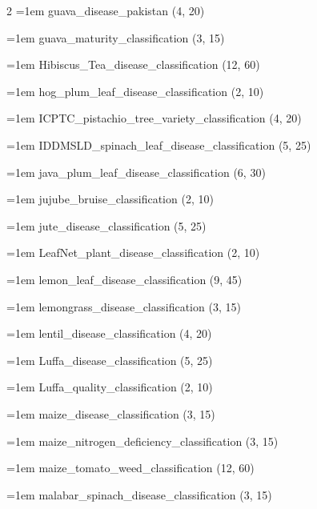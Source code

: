 \begin{multicols}{2}
\hangindent=1em guava\_\allowbreak{}disease\_\allowbreak{}pakistan (4, 20)\par
\hangindent=1em guava\_\allowbreak{}maturity\_\allowbreak{}classification (3, 15)\par
\hangindent=1em Hibiscus\_\allowbreak{}Tea\_\allowbreak{}disease\_\allowbreak{}classification (12, 60)\par
\hangindent=1em hog\_\allowbreak{}plum\_\allowbreak{}leaf\_\allowbreak{}disease\_\allowbreak{}classification (2, 10)\par
\hangindent=1em ICPTC\_\allowbreak{}pistachio\_\allowbreak{}tree\_\allowbreak{}variety\_\allowbreak{}classification (4, 20)\par
\hangindent=1em IDDMSLD\_\allowbreak{}spinach\_\allowbreak{}leaf\_\allowbreak{}disease\_\allowbreak{}classification (5, 25)\par
\hangindent=1em java\_\allowbreak{}plum\_\allowbreak{}leaf\_\allowbreak{}disease\_\allowbreak{}classification (6, 30)\par
\hangindent=1em jujube\_\allowbreak{}bruise\_\allowbreak{}classification (2, 10)\par
\hangindent=1em jute\_\allowbreak{}disease\_\allowbreak{}classification (5, 25)\par
\hangindent=1em LeafNet\_\allowbreak{}plant\_\allowbreak{}disease\_\allowbreak{}classification (2, 10)\par
\hangindent=1em lemon\_\allowbreak{}leaf\_\allowbreak{}disease\_\allowbreak{}classification (9, 45)\par
\hangindent=1em lemongrass\_\allowbreak{}disease\_\allowbreak{}classification (3, 15)\par
\hangindent=1em lentil\_\allowbreak{}disease\_\allowbreak{}classification (4, 20)\par
\hangindent=1em Luffa\_\allowbreak{}disease\_\allowbreak{}classification (5, 25)\par
\hangindent=1em Luffa\_\allowbreak{}quality\_\allowbreak{}classification (2, 10)\par
\hangindent=1em maize\_\allowbreak{}disease\_\allowbreak{}classification (3, 15)\par
\hangindent=1em maize\_\allowbreak{}nitrogen\_\allowbreak{}deficiency\_\allowbreak{}classification (3, 15)\par
\hangindent=1em maize\_\allowbreak{}tomato\_\allowbreak{}weed\_\allowbreak{}classification (12, 60)\par
\hangindent=1em malabar\_\allowbreak{}spinach\_\allowbreak{}disease\_\allowbreak{}classification (3, 15)\par

\end{multicols}
